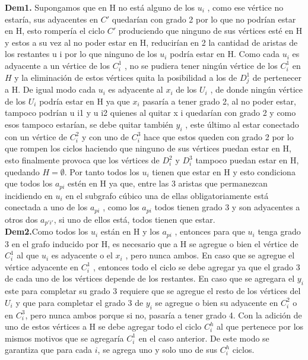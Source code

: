 \documentclass[
10pt, %
a4paper, %
oneside, %
headinclude,footinclude, %
BCOR5mm, %
]{scrartcl}
\begin{document}
\textbf{Dem1.} Supongamos que en H no está alguno de los $u_i$ , como ese vértice
no estaría, sus adyacentes en $C'$ quedarían con grado 2 por lo que no podrían
estar en H, esto rompería el ciclo $C'$ produciendo que ninguno de sus vértices
esté en H y estos a su vez al no poder estar en H, reducirían en 2 la cantidad
de aristas de los restantes u i por lo que ninguno de los $u_i$ podría estar en H.
Como cada $u_i$ es adyacente a un vértice de los $C^1_i$ , no se pudiera tener ningún
vértice de los $C^1_i$ en $H$ y la eliminación de estos vértices quita la posibilidad a
los de $D^1_j$ de pertenecer a H. De igual modo cada $u_i$ es adyacente al $x_i$ de los
$U_i$ , de donde ningún vértice de los $U_i$ podría estar en H ya que $x_i$ pasaría a
tener grado 2, al no poder estar, tampoco podrían u i1 y u i2 quienes al quitar x i
quedarían con grado 2 y como esos tampoco estarían, se debe quitar también $y_i$ ,
este último al estar conectado con un vértice de $C^2_i$ y con uno de $C^3_i$ hace que
estos queden con grado 2 por lo que rompen los ciclos haciendo que ninguno de
sus vértices puedan estar en H, esto finalmente provoca que los vértices de $D^2_i$
y $D^3_i$ tampoco puedan estar en H, quedando $H = \emptyset$.
Por tanto todos los $u_i$ tienen que estar en H y esto condiciona que todos
los $a_{pi}$ estén en H ya que, entre las 3 aristas que permanezcan incidiendo en $u_i$
en el subgrafo cúbico una de ellas obligatoriamente está conectada a uno de los
$a_{pi}$ , como los $a_{pi}$ todos tienen grado 3 y son adyacentes a otros dos $a_{p'i'}$, si uno
de ellos está, todos tienen que estar. \\


\textbf{Dem2.}Como todos los $u_i$ están en H y los $a_{pi}$ , entonces para que $u_i$ tenga
grado 3 en el grafo inducido por H, es necesario que a H se agregue o bien el
vértice de $C^1_i$ al que $u_i$ es adyacente o el $x_i$ , pero nunca ambos. En caso que
se agregue el vértice adyacente en $C^1_i$ , entonces todo el ciclo se debe agregar ya
que el grado 3 de cada uno de los vértices depende de los restantes. En caso que
se agregara el $y_i$ este para completar su grado 3 requiere que se agregue el resto de los vértices del $U_i$ y que para completar el grado 3 de $y_i$ se agregue o bien su
adyacente en $C^2_i$ o en $C^3_i$, pero nunca ambos porque si no, pasaría a tener grado
4. Con la adición de uno de estos vértices a H se debe agregar todo el ciclo $C^h_i$ al
que pertenece por los mismos motivos que se agregaría $C^1_i$ en el caso anterior. De
este modo se garantiza que para cada $i$, se agrega uno y solo uno de sus $C^h_i$ ciclos.\\
\end{document}
